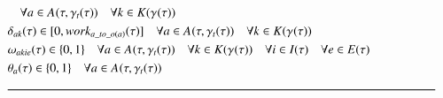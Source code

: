 {\begin{alignat}{2}
		& \quad \forall \ElementActivity \in \SetActivity{\VarSupervisorAssignment{}{\ElementTechnician}}{} \quad \forall \ElementWorkSegment \in \SetWorkSegment                                                \\
		& \VarProcessingTime \in [0, \ParOperationWork{\ElementActivity\_to\_o(\ElementActivity)} ]  \quad \forall \ElementActivity \in \SetActivity{\VarSupervisorAssignment{}{\ElementTechnician}}{} \quad \forall \ElementWorkSegment \in \SetWorkSegment                                                \\
		& \VarSegmentInRelation \in \{0 , 1\}                                                                                                                                                                                                                                                                                     \quad \forall \ElementActivity \in \SetActivity{\VarSupervisorAssignment{}{\ElementTechnician}}{} \quad \forall \ElementWorkSegment \in \SetWorkSegment  \quad \forall i \in \SetTimeInstance \quad \forall \ElementEvent \in \SetEvent                                                                                                                         \\
		& \VarIncludeActivity{\ElementActivity} \in \{0, 1\}                                                                                                                                      \quad \forall \ElementActivity \in \SetActivity{\VarSupervisorAssignment{}{\ElementTechnician}}{}                                                                                                     \\ 
		& \text{\rule{\linewidth}{0.8pt}} \notag \label{}                                                                                                                                                                                                                                                                                                                                                                      
	\end{alignat}
}
